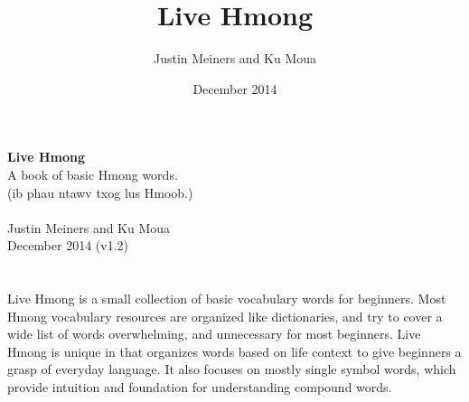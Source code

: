 \documentclass{article}
\title{Live Hmong}
\author{Justin Meiners and Ku Moua}
\date{December 2014}
\begin{document}
\begin{titlepage}
\begin{center}
\setlength\fboxsep{0pt}
\setlength\fboxrule{0.0pt}

\textbf{Live Hmong} \\
\large A book of basic Hmong words. \\
(ib phau ntawv txog lus Hmoob.) \\
~ \\
Justin Meiners and Ku Moua \\
December 2014 (v1.2) \\

\end{center}
\end{titlepage}

\section*{}
Live Hmong is a small collection of basic vocabulary words for beginners.
Most Hmong vocabulary resources are organized like dictionaries, and try to cover a wide list of words overwhelming, and unnecessary for most beginners.
Live Hmong is unique in that organizes words based on life context to give beginners a grasp of everyday language.
 It also focuses on mostly single symbol words, which provide intuition and foundation for understanding compound words.
\end{document}
